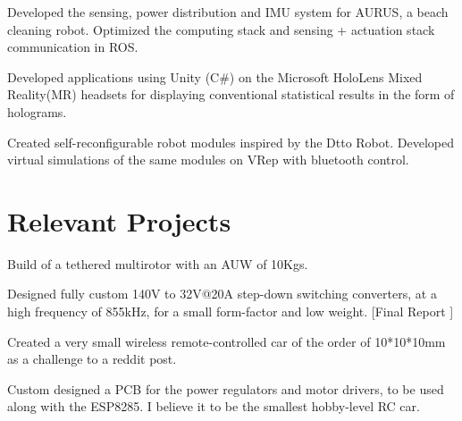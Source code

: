 \documentclass[]{deedy-resume-openfont}
\begin{document}
\begin{minipage}[t]{0.66\textwidth}
\sectionsep


Developed the sensing, power distribution and IMU system for AURUS, a beach cleaning robot. Optimized the computing stack and sensing + actuation stack communication in ROS.

\sectionsep


Developed applications using Unity (C\#) on the Microsoft HoloLens Mixed Reality(MR) headsets for displaying conventional statistical results in the form of holograms.

\sectionsep


Created self-reconfigurable robot modules inspired by the Dtto Robot. Developed virtual simulations of the same modules on VRep with bluetooth control.

\sectionsep


\end{minipage} 

\newpage



\section{Relevant Projects}

\begin{tightemize}
	\item Build of a tethered multirotor with an AUW of 10Kgs.
	\item Designed fully custom 140V to 32V@20A step-down switching converters, at a high frequency of 855kHz, for a small form-factor and low weight. [Final Report \href{http://bit.ly/ATLAS-Report}{ \faExternalLink}]
\end{tightemize}
\sectionsep

\begin{tightemize}
	\item Created a very small wireless remote-controlled car of the order of 10*10*10mm as a challenge to a reddit post.
	\item Custom designed a PCB for the power regulators and motor drivers, to be used along with the ESP8285. I believe it to be the smallest hobby-level RC car. 
\end{tightemize}
\sectionsep
\end{document}
